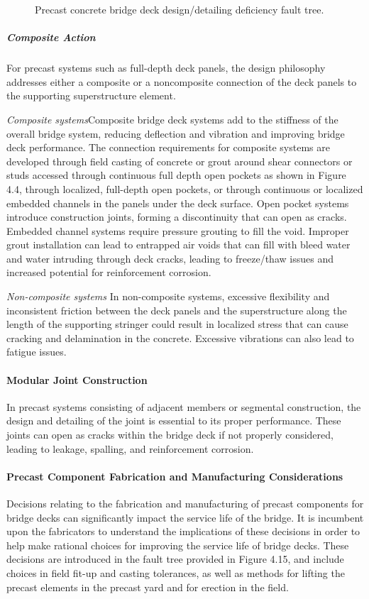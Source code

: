 \begin{figure}
  \caption{Precast concrete bridge deck design/detailing deficiency fault tree.}\label{fig:fault-tree-precast-deck-design}
\end{figure}

\subparagraph*{Composite Action}
For precast systems such as full-depth deck panels, the design philosophy addresses either a composite or a noncomposite
connection of the deck panels to the supporting superstructure element.

\emph{Composite systems}Composite bridge deck systems add to the stiffness of the overall bridge system, reducing
deflection and vibration and improving bridge deck performance. The connection requirements for composite
systems are developed through field casting of concrete or grout around shear connectors or studs accessed through
continuous full depth open pockets as shown in Figure 4.4, through localized, full-depth open pockets, or through
continuous or localized embedded channels in the panels under the deck surface. Open pocket systems introduce
construction joints, forming a discontinuity that can open as cracks. Embedded channel systems require pressure
grouting to fill the void. Improper grout installation can lead to entrapped air voids that can fill with bleed water and water intruding through deck cracks, leading to freeze/thaw issues and increased potential for reinforcement
corrosion.

\emph{Non-composite systems}
In non-composite systems, excessive flexibility and inconsistent friction between the deck
panels and the superstructure along the length of the supporting stringer could result in localized stress that can cause
cracking and delamination in the concrete. Excessive vibrations can also lead to fatigue issues.

\paragraph{Modular Joint Construction}
In precast systems consisting of adjacent members or segmental construction, the design and detailing of the joint
is essential to its proper performance. These joints can open as cracks within the bridge deck if not properly
considered, leading to leakage, spalling, and reinforcement corrosion.


\paragraph{Precast Component Fabrication and Manufacturing Considerations}
Decisions relating to the fabrication and manufacturing of precast components for bridge decks can significantly
impact the service life of the bridge. It is incumbent upon the fabricators to understand the implications of these
decisions in order to help make rational choices for improving the service life of bridge decks. These decisions are
introduced in the fault tree provided in Figure 4.15, and include choices in field fit-up and casting tolerances, as well
as methods for lifting the precast elements in the precast yard and for erection in the field.

